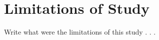\section{Limitations of Study} \label{sec:limitations}
Write what were the limitations of this study . . .
